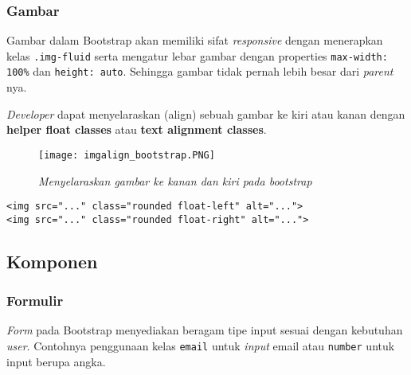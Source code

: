 \subsubsection{Gambar}
Gambar dalam Bootstrap akan memiliki sifat \textit{responsive} dengan menerapkan kelas \texttt{.img-fluid} serta mengatur lebar gambar dengan properties \texttt{max-width: 100\%} dan \texttt{height: auto}. Sehingga gambar tidak pernah lebih besar dari \textit{parent} nya. 

\textit{Developer} dapat menyelaraskan (align) sebuah gambar ke kiri atau kanan dengan \textbf{helper float classes} atau \textbf{text alignment classes}. 
\begin{figure} [H]
	\centering  
	\texttt{[image: imgalign\_bootstrap.PNG]}  
	\caption{\it{Menyelaraskan gambar ke kanan dan kiri pada bootstrap}} 
\end{figure}
\begin{lstlisting}[frame=single]
<img src="..." class="rounded float-left" alt="...">
<img src="..." class="rounded float-right" alt="...">
\end{lstlisting}



\subsection{Komponen}
\subsubsection{Formulir}
\textit{Form} pada Bootstrap menyediakan beragam tipe input sesuai dengan kebutuhan \textit{user}. Contohnya penggunaan kelas \texttt{email} untuk \textit{input} email atau \texttt{number} untuk input berupa angka.
